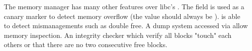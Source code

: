 The memory manager has many other features over libc's . The field  is used as a canary marker to detect memory overflow (the value should always be ).  is able to detect mismanagements such as double free. A dump system accessed via  allow memory inspection.  An integrity checker  which verify all blocks "touch" each others or that there are no two consecutive free blocks.\\
\par
{}

\pagebreak
